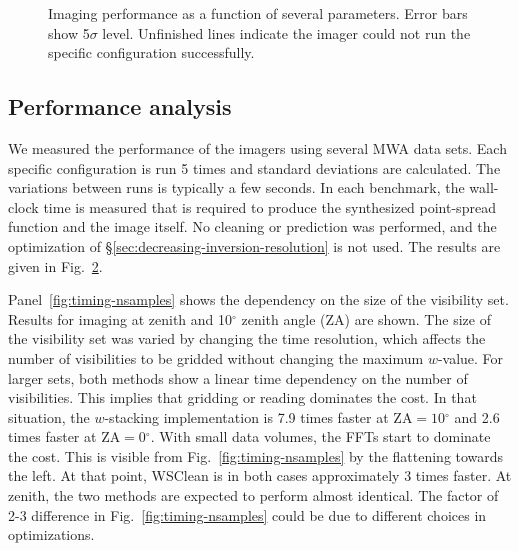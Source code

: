 \documentclass[useAMS,usenatbib]{mn2e}
\newcommand{\degree}{\ensuremath{^{\circ}}\xspace}
\begin{document}
\begin{figure}
\begin{subfigure}{.5\linewidth}
\caption{}\label{fig:timing-fov}%
\end{subfigure}%
\caption{Imaging performance as a function of several parameters. Error bars show 5$\sigma$ level. Unfinished lines indicate the imager could not run the specific configuration successfully.}\label{fig:timings}
\end{figure}

\subsection{Performance analysis}

We measured the performance of the imagers using several MWA data sets. Each specific configuration is run 5 times and standard deviations are calculated. The variations between runs is typically a few seconds. In each benchmark, the wall-clock time is measured that is required to produce the synthesized point-spread function and the image itself. No cleaning or prediction was performed, and the optimization of \S\ref{sec:decreasing-inversion-resolution} is not used. The results are given in Fig.~\ref{fig:timings}.

Panel~\ref{fig:timing-nsamples} shows the dependency on the size of the visibility set. Results for imaging at zenith and 10\degree zenith angle (ZA) are shown. The size of the visibility set was varied by changing the time resolution, which affects the number of visibilities to be gridded without changing the maximum $w$-value. For larger sets, both methods show a linear time dependency on the number of visibilities. This implies that gridding or reading dominates the cost. In that situation, the $w$-stacking implementation is 7.9 times faster at $\textrm{ZA}=10\degree$ and 2.6 times faster at $\textrm{ZA}=0\degree$. With small data volumes, the FFTs start to dominate the cost. This is visible from Fig.~\ref{fig:timing-nsamples} by the flattening towards the left. At that point, WSClean is in both cases approximately 3 times faster. At zenith, the two methods are expected to perform almost identical. The factor of 2-3 difference in Fig.~\ref{fig:timing-nsamples} could be due to different choices in optimizations.
\end{document}
